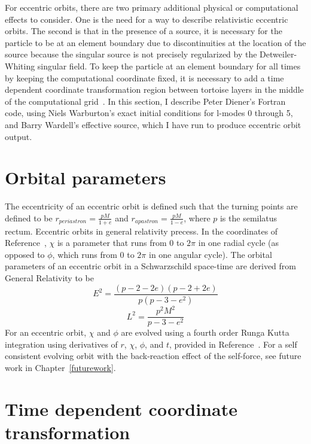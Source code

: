 For eccentric orbits, there are two primary additional physical or computational effects to consider. One is the need for a way to describe relativistic eccentric orbits. The second is that in the presence of a source, it is necessary for the particle to be at an element boundary due to discontinuities at the location of the source because the singular source is not precisely regularized by the Detweiler-Whiting singular field. To keep the particle at an element boundary for all times by keeping the computational coordinate fixed, it is necessary to add a time dependent coordinate transformation region between tortoise layers in the middle of the computational grid~\cite{time_dependent_coordinate_transformation}. In this section, I describe Peter Diener's Fortran code, using Niels Warburton's exact initial conditions for l-modes 0 through 5, and Barry Wardell's effective source, which I have run to produce eccentric orbit output. 

\section{Orbital parameters}

The eccentricity of an eccentric orbit is defined such that the turning points are defined to be $r_{periastron}=\frac{pM}{1+e}$ and $r_{apastron}=\frac{pM}{1-e}$, where $p$ is the semilatus rectum. Eccentric orbits in general relativity precess. In the coordinates of Reference~\cite{pound_poisson}, $\chi$ is a parameter that runs from $0$ to $2\pi$ in one radial cycle (as opposed to $\phi$, which runs from $0$ to $2\pi$ in one angular cycle). The orbital parameters of an eccentric orbit in a Schwarzschild space-time are derived from General Relativity to be 
\begin{equation}
  E^2=\frac{(p-2-2e)(p-2+2e)}{p(p-3-e^2)}
\end{equation}
\begin{equation}
  L^2=\frac{p^2M^2}{p-3-e^2}
\end{equation}
For an eccentric orbit, $\chi$ and $\phi$ are evolved using a fourth order Runga Kutta integration using derivatives of $r$, $\chi$, $\phi$, and $t$, provided in Reference~\cite{pound_poisson}. For a self consistent evolving orbit with the back-reaction effect of the self-force, see future work in Chapter~\ref{futurework}. 


\section{Time dependent coordinate transformation}

